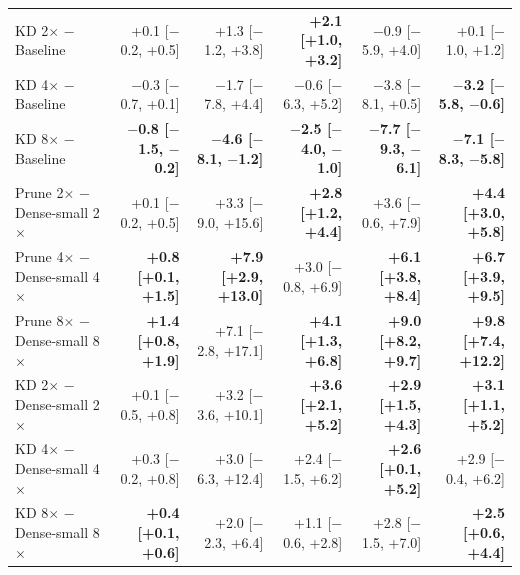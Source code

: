 \begin{tabular}{lrrrrr}
\midrule
KD 2$\times$ $-$ Baseline & +0.1 {\scriptsize[$-$0.2, +0.5]} & +1.3 {\scriptsize[$-$1.2, +3.8]} & \textbf{+2.1 {\scriptsize[+1.0, +3.2]}} & $-$0.9 {\scriptsize[$-$5.9, +4.0]} & +0.1 {\scriptsize[$-$1.0, +1.2]} \\
KD 4$\times$ $-$ Baseline & $-$0.3 {\scriptsize[$-$0.7, +0.1]} & $-$1.7 {\scriptsize[$-$7.8, +4.4]} & $-$0.6 {\scriptsize[$-$6.3, +5.2]} & $-$3.8 {\scriptsize[$-$8.1, +0.5]} & \textbf{$-$3.2 {\scriptsize[$-$5.8, $-$0.6]}} \\
KD 8$\times$ $-$ Baseline & \textbf{$-$0.8 {\scriptsize[$-$1.5, $-$0.2]}} & \textbf{$-$4.6 {\scriptsize[$-$8.1, $-$1.2]}} & \textbf{$-$2.5 {\scriptsize[$-$4.0, $-$1.0]}} & \textbf{$-$7.7 {\scriptsize[$-$9.3, $-$6.1]}} & \textbf{$-$7.1 {\scriptsize[$-$8.3, $-$5.8]}} \\
\midrule
Prune 2$\times$ $-$ Dense-small 2$\times$ & +0.1 {\scriptsize[$-$0.2, +0.5]} & +3.3 {\scriptsize[$-$9.0, +15.6]} & \textbf{+2.8 {\scriptsize[+1.2, +4.4]}} & +3.6 {\scriptsize[$-$0.6, +7.9]} & \textbf{+4.4 {\scriptsize[+3.0, +5.8]}} \\
Prune 4$\times$ $-$ Dense-small 4$\times$ & \textbf{+0.8 {\scriptsize[+0.1, +1.5]}} & \textbf{+7.9 {\scriptsize[+2.9, +13.0]}} & +3.0 {\scriptsize[$-$0.8, +6.9]} & \textbf{+6.1 {\scriptsize[+3.8, +8.4]}} & \textbf{+6.7 {\scriptsize[+3.9, +9.5]}} \\
Prune 8$\times$ $-$ Dense-small 8$\times$ & \textbf{+1.4 {\scriptsize[+0.8, +1.9]}} & +7.1 {\scriptsize[$-$2.8, +17.1]} & \textbf{+4.1 {\scriptsize[+1.3, +6.8]}} & \textbf{+9.0 {\scriptsize[+8.2, +9.7]}} & \textbf{+9.8 {\scriptsize[+7.4, +12.2]}} \\
\midrule
KD 2$\times$ $-$ Dense-small 2$\times$ & +0.1 {\scriptsize[$-$0.5, +0.8]} & +3.2 {\scriptsize[$-$3.6, +10.1]} & \textbf{+3.6 {\scriptsize[+2.1, +5.2]}} & \textbf{+2.9 {\scriptsize[+1.5, +4.3]}} & \textbf{+3.1 {\scriptsize[+1.1, +5.2]}} \\
KD 4$\times$ $-$ Dense-small 4$\times$ & +0.3 {\scriptsize[$-$0.2, +0.8]} & +3.0 {\scriptsize[$-$6.3, +12.4]} & +2.4 {\scriptsize[$-$1.5, +6.2]} & \textbf{+2.6 {\scriptsize[+0.1, +5.2]}} & +2.9 {\scriptsize[$-$0.4, +6.2]} \\
KD 8$\times$ $-$ Dense-small 8$\times$ & \textbf{+0.4 {\scriptsize[+0.1, +0.6]}} & +2.0 {\scriptsize[$-$2.3, +6.4]} & +1.1 {\scriptsize[$-$0.6, +2.8]} & +2.8 {\scriptsize[$-$1.5, +7.0]} & \textbf{+2.5 {\scriptsize[+0.6, +4.4]}} \\
\bottomrule
\end{tabular}
